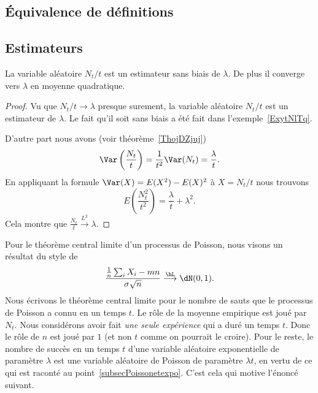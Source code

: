 \subsection{Équivalence de définitions}

\subsection{Estimateurs}

\begin{proposition}
	La variable aléatoire \( N_t/t\) est un estimateur sans biais de \( \lambda\). De plus il converge vers \( \lambda\) en moyenne quadratique.
\end{proposition}

\begin{proof}
	Vu que \( N_t/t\to\lambda\) presque surement, la variable aléatoire \( N_t/t\) est un estimateur de \( \lambda\). Le fait qu'il soit sans biais a été fait dans l'exemple~\ref{ExytNlTq}.

	D'autre part nous avons (voir théorème~\ref{ThojDZjuj})
	\begin{equation}
		\Var\left( \frac{ N_t }{ t } \right)=\frac{1}{ t^2 }\Var(N_t)=\frac{ \lambda }{ t }.
	\end{equation}
	En appliquant la formule \( \Var(X)=E(X^2)-E(X)^2\) à \( X=N_t/t\) nous trouvons
	\begin{equation}
		E\left( \frac{ N_t^2 }{ t^2 } \right)=\frac{ \lambda }{ t }+\lambda^2.
	\end{equation}
	Cela montre que \( \frac{ N_t }{ t }\stackrel{L^2}{\longrightarrow}\lambda\).
\end{proof}

Pour le théorème central limite d'un processus de Poisson, nous visons un résultat du style de
\begin{equation}
	\frac{ \frac{1}{ n }\sum_iX_i-mn }{ \sigma\sqrt{n} }\stackrel{\hL}{\longrightarrow}\dN(0,1).
\end{equation}
Nous écrivons le théorème central limite pour le nombre de sauts que le processus de Poisson a connu en un temps \( t\). Le rôle de la moyenne empirique est joué par \( N_t\). Nous considérons avoir fait \emph{une seule expérience} qui a duré un temps \( t\). Donc le rôle de \( n\) est joué par \( 1\) (et non \( t\) comme on pourrait le croire). Pour le reste, le nombre de succès en un temps \( t\) d'une variable aléatoire exponentielle de paramètre \( \lambda\) est une variable aléatoire de Poisson de paramètre \( \lambda t\), en vertu de ce qui est raconté au point~\ref{subsecPoissonetexpo}. C'est cela qui motive l'énoncé suivant.

